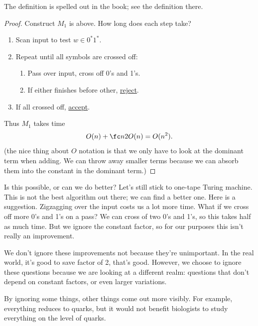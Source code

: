 The definition is spelled out in the book; see the definition there.
\begin{proof}
Construct $M_1$ is above. How long does each step take?
\begin{enumerate}
\item
Scan input to test $w\in 0^*1^*$. %
\item 
Repeat until all symbols are crossed off: 
\begin{enumerate}
\item
Pass over input, cross off 0's and 1's. 
\item
If either finishes before other, \ul{reject}.
\end{enumerate}
\item If all crossed off, \ul{accept}.
\end{enumerate}
Thus $M_1$ takes time 
\[O(n)+\fc n2O(n)=O(n^2).\]
(the nice thing about $O$ notation is that we only have to look at the dominant term when adding. We can throw away smaller terms because we can absorb them into the constant in the  dominant term.)
\end{proof}
Is this possible, or can we do better? Let's still stick to one-tape Turing machine. This is not the best algorithm out there; we can find a better one. Here is a suggestion. Zigzagging over the input costs us a lot more time. What if we cross off more 0's and 1's on a pass? We can cross of two 0's and 1's, so this takes half as much time. But we ignore the constant factor, so for our purposes this isn't really an improvement.

We don't ignore these improvements not because they're unimportant. %
In the real world, it's good to save factor of 2, that's good. However, we choose to ignore these questions because we are looking at a different realm: questions that don't depend on constant factors, or even larger variations.

By ignoring some things, other things come out more visibly. %
For example, everything reduces to quarks, but it would not benefit biologists to study everything on the level of quarks.

